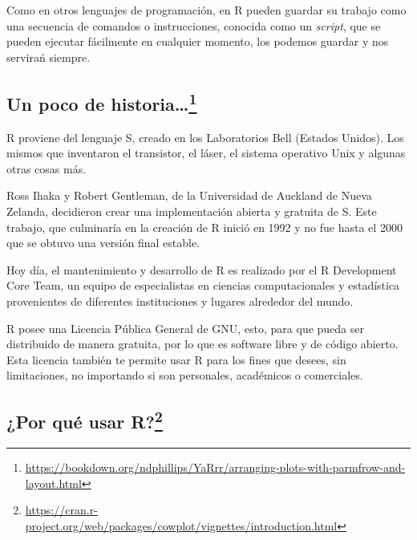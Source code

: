 \documentclass[
]{book}
\begin{document}
Como en otros lenguajes de programación, en R pueden guardar su trabajo como una secuencia de comandos o instrucciones, conocida como un \emph{script}, que se pueden ejecutar fácilmente en cualquier momento, los podemos guardar y nos servirań siempre.

\subsection[Un poco de historia\ldots{}]{\texorpdfstring{Un poco de historia\ldots{}\footnote{\url{https://bookdown.org/ndphillips/YaRrr/arranging-plots-with-parmfrow-and-layout.html}}}{Un poco de historia\ldots{}}}\label{un-poco-de-historia1}

R proviene del lenguaje S, creado en los Laboratorios Bell (Estados Unidos).
Los mismos que inventaron el transistor, el láser, el sistema operativo Unix y algunas otras cosas más.

Ross Ihaka y Robert Gentleman, de la Universidad de Auckland de Nueva Zelanda, decidieron crear una implementación abierta y gratuita de S.
Este trabajo, que culminaría en la creación de R inició en 1992 y no fue hasta el 2000 que se obtuvo una versión final estable.

Hoy día, el mantenimiento y desarrollo de R es realizado por el R Development Core Team, un equipo de especialistas en ciencias computacionales y estadística provenientes de diferentes instituciones y lugares alrededor del mundo.

R posee una Licencia Pública General de GNU, esto, para que pueda ser distribuido de manera gratuita, por lo que es software libre y de código abierto.
Esta licencia también te permite usar R para los fines que desees, sin limitaciones, no importando si son personales, académicos o comerciales.

\subsection[¿Por qué usar R?]{\texorpdfstring{¿Por qué usar R?\footnote{\url{https://cran.r-project.org/web/packages/cowplot/vignettes/introduction.html}}}{¿Por qué usar R?}}\label{por-quuxe9-usar-r2}
\end{document}
